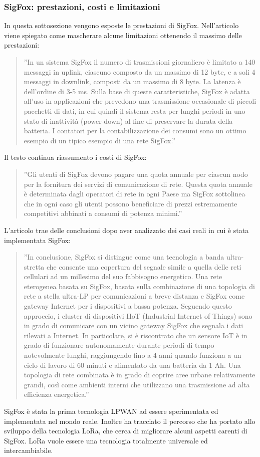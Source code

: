 \documentclass[a4paper]{report} %
\begin{document}
\subsubsection{SigFox: prestazioni, costi e limitazioni}
In questa sottosezione vengono esposte le prestazioni di SigFox.
Nell'articolo \cite{art:rif.23} viene spiegato come mascherare alcune limitazioni ottenendo il massimo delle prestazioni:
\begin{quote}
	''In un sistema SigFox il numero di trasmissioni giornaliero è limitato a 140 messaggi in uplink, ciascuno composto da un massimo di 12 byte, e a soli 4 messaggi in downlink, composti da un massimo di 8 byte. La latenza è dell'ordine di 3-5 ms. Sulla base di queste caratteristiche, SigFox è adatta all'uso in applicazioni che prevedono una trasmissione occasionale di piccoli pacchetti di dati, in cui quindi il sistema resta per lunghi periodi in uno stato di inattività (power-down) al fine di preservare la durata della batteria. I contatori per la contabilizzazione dei consumi sono un ottimo esempio di un tipico esempio di una rete SigFox.''
\end{quote}
Il testo continua riassumento i costi di SigFox:
\begin{quote}
	''Gli utenti di SigFox devono pagare una quota annuale per ciascun nodo per la fornitura dei servizi di comunicazione di rete. Questa quota annuale è determinata dagli operatori di rete in ogni Paese ma SigFox sottolinea che in ogni caso gli utenti possono beneficiare di prezzi estremamente competitivi abbinati a consumi di potenza minimi.''
\end{quote}
L'articolo \cite{art:rif.42} trae delle conclusioni dopo aver analizzato dei casi reali in cui è stata implementata SigFox:
\begin{quote}
	''In conclusione, SigFox si distingue come una tecnologia a banda ultra-stretta che consente una copertura del segnale simile a quella delle reti cellulari ad un millesimo del suo fabbisogno energetico. Una rete eterogenea basata su SigFox, basata sulla combinazione di una topologia di rete a stella ultra-LP per comunicazioni a breve distanza e SigFox come gateway Internet per i dispositivi a bassa potenza. Seguendo questo approccio, i cluster di dispositivi IIoT (Industrial Internet of Things) sono in grado di comunicare con un vicino gateway SigFox che segnala i dati rilevati a Internet. In particolare, si è riscontrato che un sensore IoT è in grado di funzionare autonomamente durante periodi di tempo notevolmente lunghi, raggiungendo fino a 4 anni quando funziona a un ciclo di lavoro di 60 minuti e alimentato da una batteria da 1 Ah. Una topologia di rete combinata è in grado di coprire aree urbane relativamente grandi, così come ambienti interni che utilizzano una trasmissione ad alta efficienza energetica.'' 
\end{quote}
SigFox è stata la prima tecnologia LPWAN ad essere sperimentata ed implementata nel mondo reale. Inoltre ha tracciato il percorso che ha portato allo sviluppo della tecnologia LoRa, che cerca di migliorare alcuni aspetti carenti di SigFox. LoRa vuole essere una tecnologia totalmente universale ed intercambiabile.
\end{document}

